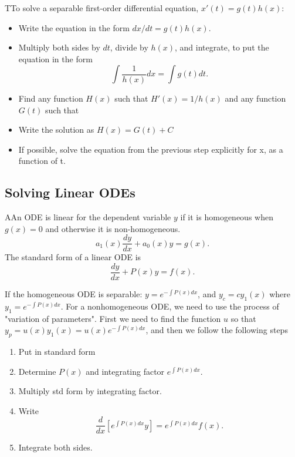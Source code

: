   \begin{theorem}
    TTo solve a separable first-order differential equation, $x'(t)=g(t)h(x)$:
    \begin{itemize}
      \item Write the equation in the form $dx/dt=g(t)h(x)$.
      \item Multiply both sides by $dt$, divide by $h(x)$, and integrate, to put the equation in the form 
        \[
          \int \frac{1}{h(x)}dx =\int g(t)dt.
        \]
      \item Find any function $H(x)$ such that $H'(x)=1/h(x)$ and any function $G(t)$ such that %
      \item Write the solution as $H(x)=G(t)+C$
      \item If possible, solve the equation from the previous step explicitly for x, as a function of t.
    \end{itemize}
  \end{theorem}

\subsection{Solving Linear ODEs}

 \begin{definition}
   AAn ODE is linear for the dependent variable $y$ if it is homogeneous when $g(x)=0$ and otherwise it is non-homogeneous.
   \[
     a_1(x)\frac{dy}{dx}+a_0(x)y=g(x)
   .\] 
   The standard form of a linear ODE is
   \[
     \frac{dy}{dx}+P(x)y=f(x)
   .\] 
 \end{definition}
 
 If the homogeneous ODE is separable: $y=e^{-\int P(x)dx}$, and $y_c=cy_1(x)$ where $y_1=e^{-\int P(x)dx}$. For a nonhomogeneous ODE, we need to use the process of "variation of parameters". First we need to find the function $u$ so that $y_p=u(x)y_1(x)=u(x)e^{-\int P(x)dx}$, and then we follow the following steps

 \begin{enumerate}
   \item Put in standard form
   \item Determine $P(x)$ and integrating factor $e^{\int P(x)dx}$.
   \item Multiply std form by integrating factor.
   \item Write \[
       \frac{d}{dx}\left[e^{\int P(x)dx}y\right]=e^{\int P(x)dx}f(x)
   .\] 
  \item Integrate both sides.
 \end{enumerate}

